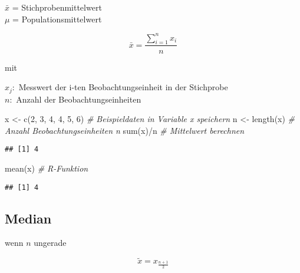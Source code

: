 \documentclass[
]{book}
\newenvironment{Shaded}{\begin{snugshade}}{\end{snugshade}}
\newcommand{\CommentTok}[1]{\textcolor[rgb]{0.56,0.35,0.01}{\textit{#1}}}
\newcommand{\DecValTok}[1]{\textcolor[rgb]{0.00,0.00,0.81}{#1}}
\newcommand{\FunctionTok}[1]{\textcolor[rgb]{0.00,0.00,0.00}{#1}}
\newcommand{\NormalTok}[1]{#1}
\newcommand{\OtherTok}[1]{\textcolor[rgb]{0.56,0.35,0.01}{#1}}
\newcommand{\SpecialCharTok}[1]{\textcolor[rgb]{0.00,0.00,0.00}{#1}}
\begin{document}
\(\bar{x}\) = Stichprobenmittelwert\\
\(\mu\) = Populationsmittelwert

\begin{equation}
  \bar{x} = \frac{\sum_{i=1}^n x_i}{n}
  \label{eq:mittelwert}
\end{equation}

mit

\(x_j:\) Messwert der i-ten Beobachtungseinheit in der Stichprobe\\
\(n:\) Anzahl der Beobachtungseinheiten

\begin{Shaded}
\begin{Highlighting}[]
\NormalTok{x }\OtherTok{\textless{}{-}} \FunctionTok{c}\NormalTok{(}\DecValTok{2}\NormalTok{, }\DecValTok{3}\NormalTok{, }\DecValTok{4}\NormalTok{, }\DecValTok{4}\NormalTok{, }\DecValTok{5}\NormalTok{, }\DecValTok{6}\NormalTok{)    }\CommentTok{\# Beispieldaten in Variable x speichern}
\NormalTok{n }\OtherTok{\textless{}{-}} \FunctionTok{length}\NormalTok{(x)              }\CommentTok{\# Anzahl Beobachtungseinheiten n}
\FunctionTok{sum}\NormalTok{(x)}\SpecialCharTok{/}\NormalTok{n                    }\CommentTok{\# Mittelwert berechnen}
\end{Highlighting}
\end{Shaded}

\begin{verbatim}
## [1] 4
\end{verbatim}

\begin{Shaded}
\begin{Highlighting}[]
\FunctionTok{mean}\NormalTok{(x)                     }\CommentTok{\# R{-}Funktion}
\end{Highlighting}
\end{Shaded}

\begin{verbatim}
## [1] 4
\end{verbatim}

\hypertarget{median}{%
\subsection{Median}\label{median}}

wenn \(n\) ungerade

\begin{equation}
  \tilde{x} = x_{\frac{n+1}{2}}
  \label{eq:median1}
\end{equation}
\end{document}
